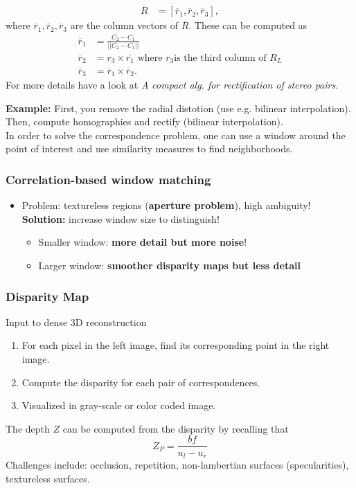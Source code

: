 \documentclass[a4paper,12 pt]{article}
\theoremstyle{definition}
\theoremstyle{remark}
\theoremstyle{definition}
\theoremstyle{definition}
\theoremstyle{definition}
\theoremstyle{remark}
\theoremstyle{definition}
\begin{document}
\begin{enumerate}
\begin{equation}
\begin{split}
\overline{R}&=[\overline{r}_1,\overline{r}_2,\overline{r}_3],
\end{split}
\end{equation}
where $\overline{r}_1,\overline{r}_2,\overline{r}_3$ are the column vectors of $\overline{R}$. These can be computed as
\begin{equation}
\begin{split}
\overline{r}_1&=\frac{C_2-C_1}{||C_2-C_1||}\\
\overline{r}_2&=r_3 \times \overline{r_1} \text{ where }r_3 \text{is the third column of }R_L\\
\overline{r}_3&=\overline{r}_1\times \overline{r}_2.
\end{split}
\end{equation}
For more details have a look at \textit{A compact alg. for rectification of stereo pairs}.
\end{enumerate}
\textbf{Example:} First, you remove the radial distotion (use e.g. bilinear interpolation). Then, compute homographies and rectify (bilinear interpolation). \\
In order to solve the correspondence problem, one can use a window around the point of interest and use similarity measures to find neighborhoods.
\subsubsection*{Correlation-based window matching}
\begin{itemize}
\item Problem: textureless regions (\textbf{aperture problem}), high ambiguity! \textbf{Solution:} increase window size to distinguish!
\begin{itemize}
\item Smaller window: \textbf{more detail but more noise}!
\item Larger window: \textbf{smoother disparity maps but less detail}
\end{itemize}
\end{itemize}
\subsubsection*{Disparity Map}
Input to dense 3D reconstruction
\begin{enumerate}
\item For each pixel in the left image, find its corresponding point in the right image.
\item Compute the disparity for each pair of correspondences.
\item Visualized in gray-scale or color coded image.
\end{enumerate}
The depth $Z$ can be computed from the disparity by recalling that
\begin{equation}
Z_P=\frac{bf}{u_l-u_r}
\end{equation}
Challenges include: occlusion, repetition, non-lambertian surfaces (specularities), textureless surfaces.
\end{document}
